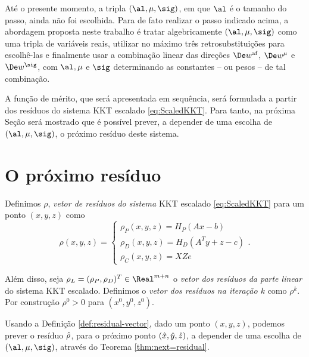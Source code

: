Até o presente momento, a tripla $(\al, \mu,\sig)$, em que $\al$ é o tamanho do
passo, ainda não foi escolhida. Para de fato realizar o passo indicado acima, a
abordagem proposta neste trabalho é tratar algebricamente $(\al, \mu,\sig)$ como
uma tripla de variáveis reais, utilizar no máximo três retrosubstituições para
escolhê-las e finalmente usar a combinação linear das direções $\dew$,
$\Dew^\mu$ e $\Dew^\sig$, com $\al,\mu$ e $\sig$ determinando
as constantes -- ou pesos --  de tal combinação.




A função de mérito, que será  apresentada em sequência, será formulada a partir
dos resíduos do sistema KKT escalado \eqref{eq:ScaledKKT}. Para tanto, na
próxima Seção será mostrado que é possível prever, a depender de
uma escolha de $(\al, \mu,\sig)$, o próximo resíduo deste sistema.


\section{O próximo resíduo}

\begin{defin} 
\label{def:residual-vector}
Definimos  $\rho$, \emph{vetor de resíduos do sistema} \ac{KKT}  escalado
\eqref{eq:ScaledKKT} para um ponto $(x,y,z)$ como
\begin{equation}
\label{eq:residuals}
\rho(x,y,z) = 
\begin{cases}
\rho_P (x,y,z)= H_P(A{x} -b)  \\
\rho_D(x,y,z)= H_D(A^T{y} +{z} -c) \\
\rho_C(x,y,z)= {X}{Z}e
\end{cases}.
\end{equation}

Além disso, seja  $\rho_L = (\rho_P,\rho_D)^T\in\Real^{m+n}$ o \emph{vetor dos
resíduos da parte linear} do  sistema \ac{KKT} escalado. Definimos o
\emph{vetor dos resíduos na iteração $k$} como $\rho^k$.
Por construção $\rho^0>0$ para $(x^0,y^0,z^0)$.
\end{defin} 



Usando a Definição \ref{def:residual-vector}, dado um ponto  $(x,y,z)$, podemos 
prever o resíduo $\hat{\rho}$, para o próximo ponto $(\hat{x},\hat{y},\hat{z})$, a  depender de uma escolha de 
$(\al,\mu,\sig)$, através do Teorema \ref{thm:next=residual}. 

